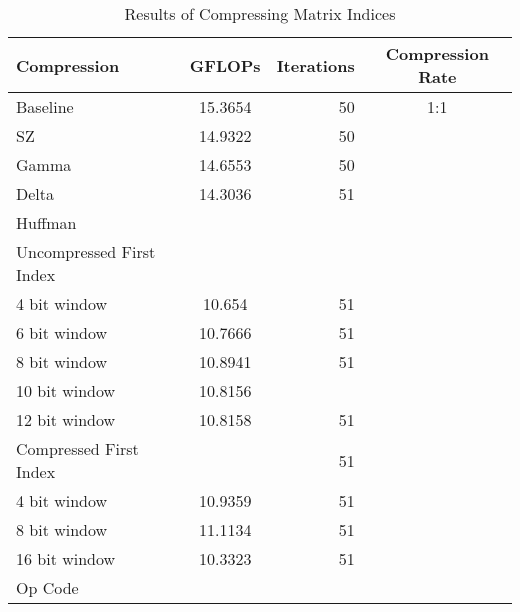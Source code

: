 \begin{table}
	\centering
	\begin{tabular}{l|S|r|c}
		Compression & GFLOPs & Iterations & Compression Rate\\
		\hline
		Baseline & 15.3654 & 50 & 1:1 \\
		SZ & 14.9322 & 50 & \\
		Gamma & 14.6553 & 50 & \\ %
		Delta & 14.3036 & 51 & \\
		Huffman & & & \\
		\hspace{3mm}Uncompressed First Index & & & \\
			\hspace{6mm}4 bit window & 10.654 & 51 & \\
			\hspace{6mm}6 bit window & 10.7666 & 51 & \\
			\hspace{6mm}8 bit window & 10.8941 & 51 & \\
			\hspace{6mm}10 bit window & 10.8156 & & \\
			\hspace{6mm}12 bit window & 10.8158 & 51 & \\
		\hspace{3mm}Compressed First Index & & 51 & \\
			\hspace{6mm}4 bit window & 10.9359 & 51 & \\
			\hspace{6mm}8 bit window & 11.1134 & 51 & \\
			\hspace{6mm}16 bit window & 10.3323 & 51 & \\
		Op Code & & & \\
	\end{tabular}
	\caption{Results of Compressing Matrix Indices}
	\label{tab:results-ind}
\end{table}

